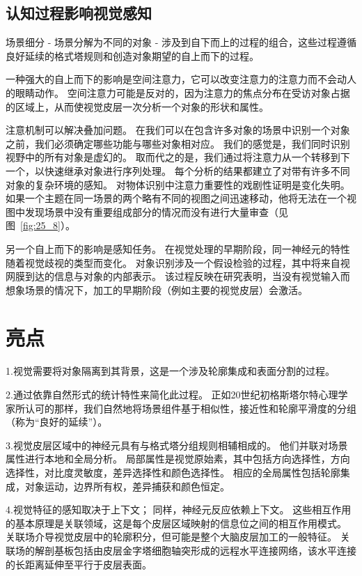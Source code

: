 \subsection{认知过程影响视觉感知}

场景细分 - 场景分解为不同的对象 - 涉及到自下而上的过程的组合，这些过程遵循良好延续的格式塔规则和创造对象期望的自上而下的过程。


一种强大的自上而下的影响是空间注意力，它可以改变注意力的注意力而不会动人的眼睛动作。
空间注意力可能是反对的，因为注意力的焦点分布在受访对象占据的区域上，从而使视觉皮层一次分析一个对象的形状和属性。


注意机制可以解决叠加问题。
在我们可以在包含许多对象的场景中识别一个对象之前，我们必须确定哪些功能与哪些对象相对应。
我们的感觉是，我们同时识别视野中的所有对象是虚幻的。
取而代之的是，我们通过将注意力从一个转移到下一个，以快速继承对象进行序列处理。
每个分析的结果都建立了对带有许多不同对象的复杂环境的感知。
对物体识别中注意力重要性的戏剧性证明是变化失明。
如果一个主题在同一场景的两个略有不同的视图之间迅速移动，他将无法在一个视图中发现场景中没有重要组成部分的情况而没有进行大量审查（见图~\ref{fig:25_8}）。


另一个自上而下的影响是感知任务。
在视觉处理的早期阶段，同一神经元的特性随着视觉歧视的类型而变化。
对象识别涉及一个假设检验的过程，其中将来自视网膜到达的信息与对象的内部表示。
该过程反映在研究表明，当没有视觉输入而想象场景的情况下，加工的早期阶段（例如主要的视觉皮层）会激活。



\section{亮点}

1.视觉需要将对象隔离到其背景，这是一个涉及轮廓集成和表面分割的过程。 


2.通过依靠自然形式的统计特性来简化此过程。
正如20世纪初格斯塔尔特心理学家所认可的那样，我们自然地将场景组件基于相似性，接近性和轮廓平滑度的分组（称为“良好的延续”）。


3.视觉皮层区域中的神经元具有与格式塔分组规则相辅相成的。
他们并联对场景属性进行本地和全局分析。
局部属性是视觉原始素，其中包括方向选择性，方向选择性，对比度灵敏度，差异选择性和颜色选择性。
相应的全局属性包括轮廓集成，对象运动，边界所有权，差异捕获和颜色恒定。


4.视觉特征的感知取决于上下文；
同样，神经元反应依赖上下文。
这些相互作用的基本原理是关联领域，这是每个皮层区域映射的信息位之间的相互作用模式。
关联场介导视觉皮层中的轮廓积分，但可能是整个大脑皮层加工的一般特征。
关联场的解剖基板包括由皮层金字塔细胞轴突形成的远程水平连接网络，该水平连接的长距离延伸至平行于皮层表面。 


